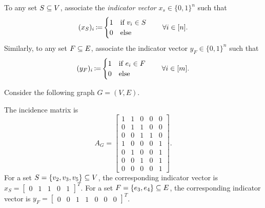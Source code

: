 \begin{defn}
    To any set $S \subseteq V$, associate the \textit{indicator vector} $x_s \in \{0,1\}^n$ such that
    \[
        (x_S)_i \operatorname*{\coloneqq} \begin{cases}
                    1 & \text{if } v_i \in S \\
                    0 & \text{else}
                  \end{cases}
        \quad \quad
        \forall i \in [n].
    \]
    Similarly, to any set $F \subseteq E$, associate the indicator vector $y_F \in \{0,1\}^n$ such that
    \[
        (y_F)_i \operatorname*{\coloneqq} \begin{cases}
                    1 & \text{if } e_i \in F \\
                    0 & \text{else}
                  \end{cases}
        \quad \quad
        \forall i \in [m].
    \]
\end{defn}

\begin{exm}
    Consider the following graph $G = (V,E)$.
    \begin{center}
    \end{center}
    The incidence matrix is
    \[
        A_G = \begin{bmatrix}
                1 & 1 & 0 & 0 & 0 \\
                0 & 1 & 1 & 0 & 0 \\
                0 & 0 & 1 & 1 & 0 \\
                1 & 0 & 0 & 0 & 1 \\
                0 & 1 & 0 & 0 & 1 \\
                0 & 0 & 1 & 0 & 1 \\
                0 & 0 & 0 & 0 & 1
              \end{bmatrix}.
    \]
    For a set $S = \{v_2, v_3, v_5\} \subseteq V$, the corresponding indicator vector is $x_S = \begin{bmatrix}0 & 1 & 1 & 0 & 1\end{bmatrix}^T$.
    For a set $F = \{e_3, e_4\} \subseteq E$, the corresponding indicator vector is $y_F = \begin{bmatrix}0 & 0 & 1 & 1 & 0 & 0 & 0\end{bmatrix}^T$.
\end{exm}

